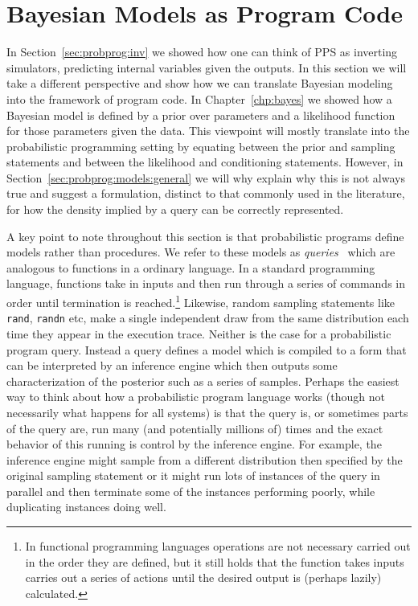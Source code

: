 
\section{Bayesian Models as Program Code}
\label{sec:probprog:models}

In Section~\ref{sec:probprog:inv} we showed how one can think of PPS as inverting simulators, 
predicting internal variables given the outputs.  In this section we will take a 
different perspective and
show how we can translate Bayesian modeling into the framework of program code.   
In Chapter~\ref{chp:bayes} we showed how a Bayesian model is defined by a prior over
parameters and a likelihood function for those parameters given the data.  This viewpoint will
mostly translate into the probabilistic programming setting by equating between the prior
and sampling statements and between the likelihood and conditioning statements.  However,
in Section~\ref{sec:probprog:models:general} we will why explain why this is not always true
and suggest a formulation, distinct to that commonly used in the literature, for how the 
density implied by a query can be correctly represented.

A key point to note throughout this section is that probabilistic programs define
models rather than procedures.  We refer to these models as \emph{queries}~\citep{goodman2008church} 
which are analogous to functions in a ordinary language.
In a standard programming language, functions take in inputs
and then run through a series of commands in order until termination is reached.\footnote{In functional
	programming languages operations are not necessary carried out in the order they are defined,
	but it still holds that the function takes inputs carries out a series of actions until the desired output
	is (perhaps lazily) calculated.}  Likewise, random sampling statements like \texttt{rand}, \texttt{randn}
etc, make a single independent draw from the same distribution each time they appear in the execution trace.
Neither is the case for a probabilistic program query.  Instead a  query defines a model
which is compiled to a form that can be interpreted by an inference engine which then
outputs some characterization of the posterior such as a series of samples.  Perhaps the easiest way to think
about how a probabilistic program language works (though not necessarily what happens for all systems) is that
the query is, or sometimes parts of the query are, run many (and potentially millions of) times and the exact behavior
of this running is control by the inference engine.  For example, the inference engine 
might sample from a different distribution then specified by the original sampling statement or it
might run lots of instances of the query in parallel and then terminate some of the instances
performing poorly, while duplicating instances doing well.

